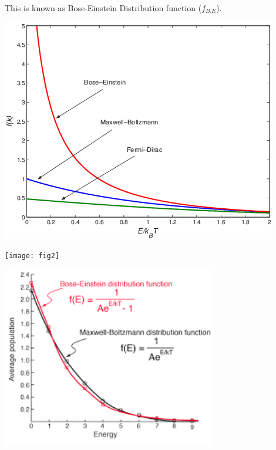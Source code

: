 \documentclass[12pt, letterpaper]{article}
\begin{document}
    This is known as Bose-Einstein Distribution function ($f_{B.E}$).

    \begin{adjustbox}{center,caption={},label={somelabel},nofloat=figure,vspace=\bigskipamount}
        \includegraphics[width=\textwidth]{fig1}
    \end{adjustbox} 

    \newpage

    \begin{adjustbox}{center,caption={},label={somelabel},nofloat=figure,vspace=\bigskipamount}
        \texttt{[image: fig2]}
    \end{adjustbox}
    
    \begin{adjustbox}{center,caption={},label={somelabel},nofloat=figure,vspace=\bigskipamount}
        \includegraphics[width=0.7\textwidth]{fig3}
    \end{adjustbox}
    
\end{document}
